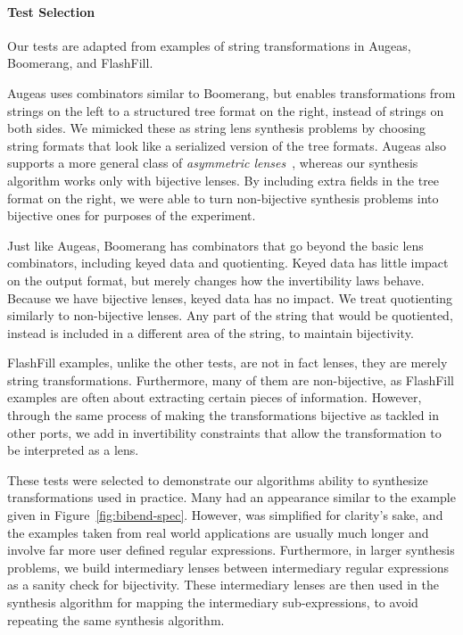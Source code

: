 \documentclass[numbers,10pt,preprint\ifanon ,nocopyrightspace\fi]{sigplanconf}
\begin{document}
\paragraph*{Test Selection}

Our tests are adapted from examples of string transformations in Augeas,
Boomerang, and FlashFill.

Augeas uses combinators similar to Boomerang, but enables transformations
from strings on the left to a structured tree format on the right, instead
of strings on both sides.  We mimicked these as string lens synthesis
problems by choosing string formats that look like a serialized version of
the tree formats.  Augeas also supports a more general class of {\em
  asymmetric lenses}~\cite{Focal2005-long}, whereas our synthesis algorithm
works only with bijective lenses.  By including extra fields in the tree
format on the right, we were able to turn non-bijective synthesis problems
into bijective ones for purposes of the experiment.

Just like Augeas, Boomerang has combinators that go beyond the basic lens
combinators, including keyed data and quotienting.  Keyed data has little impact
on the output format, but merely changes how the invertibility laws behave.  Because
we have bijective lenses, keyed data has no impact.  We treat quotienting
similarly to non-bijective lenses.  Any part of the string that would be
quotiented, instead is included in a different area of the string, to maintain
bijectivity.

FlashFill examples, unlike the other tests, are not in fact lenses, they are
merely string transformations.  Furthermore, many of them are non-bijective, as
FlashFill examples are often about extracting certain pieces of information.
However, through the same process of making the transformations bijective as
tackled in other ports, we
add in invertibility constraints that allow the transformation to be interpreted
as a lens.

These tests were selected to demonstrate our algorithms ability to synthesize
transformations used in practice.  Many had an appearance similar to the
 example given in Figure~\ref{fig:bibend-spec}.  However, 
was simplified for clarity's sake, and the examples taken from real world
applications are usually much longer and involve far more user defined regular
expressions.  Furthermore, in larger synthesis problems,
we build intermediary lenses
between intermediary regular expressions as a sanity check for bijectivity.
These intermediary lenses are then used in the synthesis algorithm for mapping
the intermediary sub-expressions, to avoid repeating the same synthesis
algorithm.
\end{document}
